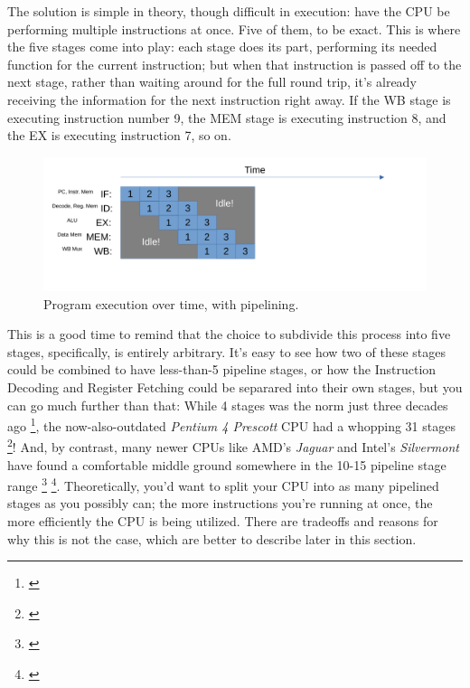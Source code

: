 \documentclass[12pt,twoside]{reedthesis}
\begin{document}
\break

The solution is simple in theory, though difficult in execution: have the CPU be performing multiple instructions at once. Five of them, to be exact. This is where the five stages come into play: each stage does its part, performing its needed function for the current instruction; but when that instruction is passed off to the next stage, rather than waiting around for the full round trip, it's already receiving the information for the next instruction right away. If the WB stage is executing instruction number 9, the MEM stage is executing instruction 8, and the EX is executing instruction 7, so on.


\begin{figure}[h!]

	\centering
	\includegraphics[scale=0.6]{pipelinedsteps.pdf}
	\caption{Program execution over time, with pipelining.}
	\label{pipelined-steps}
\end{figure}

This is a good time to remind that the choice to subdivide this process into five stages, specifically, is entirely arbitrary. It's easy to see how two of these stages could be combined to have less-than-5 pipeline stages, or how the Instruction Decoding and Register Fetching could be separared into their own stages, but you can go much further than that: While 4 stages was the norm just three decades ago \footnote{\cite{denning}}, the now-also-outdated \textit{Pentium 4 Prescott} CPU had a whopping 31 stages \footnote{\cite{shimpi}}! And, by contrast, many newer CPUs like AMD's \textit{Jaguar} and Intel's \textit{Silvermont} have found a comfortable middle ground somewhere in the 10-15 pipeline stage range \footnote{\cite{kanter1}} \footnote{\cite{kanter2}}.  Theoretically, you'd want to split your CPU into as many pipelined stages as you possibly can; the more instructions you're running at once, the more efficiently the CPU is being utilized. There are tradeoffs and reasons for why this is not the case, which are better to describe later in this section.
\end{document}
